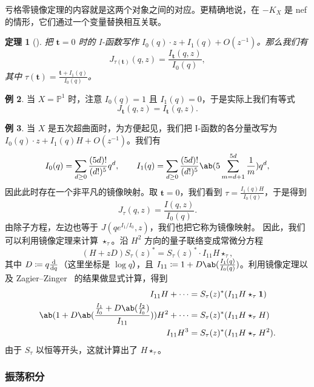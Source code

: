 \documentclass{amsart}
\newtheorem{thm}{定理}[section]
\theoremstyle{definition}
\newtheorem{exm}[thm]{例}
\theoremstyle{remark}
\theoremstyle{plain}
\theoremstyle{definition}
\theoremstyle{remark}
\renewcommand{\P}{\mathbb{P}}
\newcommand{\mbf}[1]{\mathbf{#1}}
\newcommand{\1}{\mathbf{1}}
\newcommand{\2}{\mathbf{2}}
\newcommand{\3}{\mathbf{3}}
\begin{document}
亏格零镜像定理的内容就是这两个对象之间的对应。更精确地说，在 \(-K_X\) 是 nef 的情形，它们通过一个变量替换相互关联。

\begin{thm}[{\cite{Givental1998,LLY1997}}]
    把 \(\mbf{t} = 0\) 时的 I-函数写作 \(I_0(q) \cdot z + I_1(q) + O(z^{-1})\)。那么我们有
    \[
        J_{\tau(\mbf{t})}(q,z) = \frac{I_{\mbf{t}}(q,z)}{I_0(q)},
    \]
    其中 \(\tau(\mbf{t}) = \frac{\mbf{t} + I_1(q)}{I_0(q)}\)。
\end{thm}

\begin{exm}
    当 \(X = \P^1\) 时，注意 \(I_0(q) = 1\) 且 \(I_1(q) = 0\)，于是实际上我们有等式
    \[ J_{\mbf{t}}(q,z) = I_{\mbf{t}}(q,z). \]
\end{exm}

\begin{exm}
    当 \(X\) 是五次超曲面时，为方便起见，我们把 I-函数的各分量改写为 \(I_0(q) \cdot z + I_1(q)H + O(z^{-1})\)。我们有
    \[ I_0(q) = \sum_{d \geq 0} \frac{(5d)!}{(d!)^5} q^d, \qquad I_1(q) = \sum_{d \geq 0} \frac{(5d)!}{(d!)^5} \ab(5\sum_{m=d+1}^{5d} \frac{1}{m}) q^d, \]
    因此此时存在一个非平凡的镜像映射。取 \(\mbf{t} = 0\)，我们看到 \(\tau = \frac{I_1(q)H}{I_0(q)}\)，于是得到
    \[ J_{\tau}(q,z) = \frac{I(q,z)}{I_0(q)}. \]
    由除子方程，左边也等于 \(J(qe^{I_1/I_0}, z)\)，我们也把它称为镜像映射。
    因此，我们可以利用镜像定理来计算 $\star_{\tau}$。沿 \(H^2\) 方向的量子联络变成常微分方程
    \[ (H+zD) S_{\tau}(z)^* = S_{\tau}(z)^* \cdot I_{11} H \star_{\tau}, \]
    其中 $D \coloneqq q \odv{}{q}$（这里坐标是 $\log q$），且 $I_{11} \coloneqq 1 + D \ab(\frac{I_1(q)}{I_0(q)})$。利用镜像定理以及 Zagier--Zinger~\cite{ZagierZinger2008} 的结果做显式计算，得到
    \begin{align*}
        I_{11} H + \cdots &= S_{\tau}(z)^* (I_{11} H \star_{\tau} \1) \\
        \ab( 1 + D\ab(\frac{\frac{I_1}{I_0} + D \ab(\frac{I_2}{I_0})}{I_{11}}) ) H^2 + \cdots &= S_{\tau}(z)^* (I_{11} H \star_{\tau} H) \\
        I_{11} H^3 &= S_{\tau}(z)^* (I_{11}H \star_{\tau} H^2).
    \end{align*}
    由于 \(S_{\tau}\) 以恒等开头，这就计算出了 \(H \star_{\tau}\)。
\end{exm}

\subsubsection{振荡积分}%
\label{ssub:Oscillating integrals}
\end{document}
